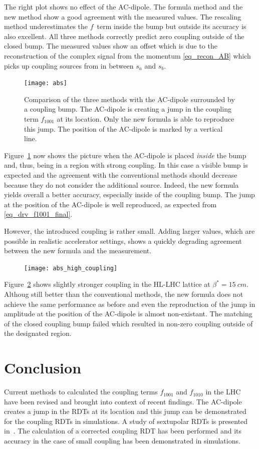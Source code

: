The right plot shows no effect of the AC-dipole.
The formula method and the new method show a good
agreement with the measured values. The rescaling method underestimates the $f$~term inside the bump but outside
its accuracy is also excellent. All three methods correctly predict zero coupling outside of the closed bump.
The measured values show an offset which is due to the reconstruction of the complex signal from the
momentum \eqref{eq_recon_AB} which picks up coupling sources from in between $s_a$ and $s_b$.
%
\begin{figure}[h]
  \centering
  \texttt{[image: abs]}
  \caption{Comparison of the three methods with the AC-dipole surrounded by a coupling bump.
    The AC-dipole is creating a jump in the coupling term $f_{1001}$ at its location. Only the new
    formula is able to reproduce this jump. The position of the AC-dipole is marked by a vertical
    line.
  }
  \label{fig_comp_felix_ryo}
\end{figure}
%

Figure~\ref{fig_comp_felix_ryo} now shows the picture when the AC-dipole is placed \emph{inside} the bump and,
thus, being in a region with strong coupling. In this case a visible bump is expected and the agreement with the
conventional methods should decrease because they do not consider the additional source.
Indeed, the new formula yields overall a better accuracy, especially inside of the coupling bump.
The jump at the position of the AC-dipole is well reproduced, as expected from \eqref{eq_drv_f1001_final}.

However, the introduced coupling is rather small. Adding larger values, which are possible in realistic accelerator
settings, shows a quickly degrading agreement between the new formula and the measurement.

\begin{figure}
    \centering
    \texttt{[image: abs\_high\_coupling]}
    \caption{}
    \label{fig_highcoupling_hilumi}
\end{figure}

Figure~\ref{fig_highcoupling_hilumi} shows slightly stronger coupling in the HL-LHC lattice at $\beta^*=\SI{15}{cm}$.
Althoug still better than the conventional methods, the new formula does not achieve the same performance as before
and even the reproduction of the jump in amplitude at the position of the AC-dipole is almost non-existant.
The matching of the closed coupling bump failed which resulted in non-zero coupling outside of the designated region.

\section{Conclusion}

Current methods to calculated the coupling terms $f_{1001}$ and $f_{1010}$ in the LHC have been revised and
brought into context of recent findings. The AC-dipole creates a jump in the RDTs at its location and this jump
can be demonstrated for the coupling RDTs in simulations. A study of sextupolar RDTs is presented in~\cite{Carlier2020}.
The calculation of a corrected coupling RDT has been performed and its accuracy in the case of small coupling
has been demonstrated in simulations.